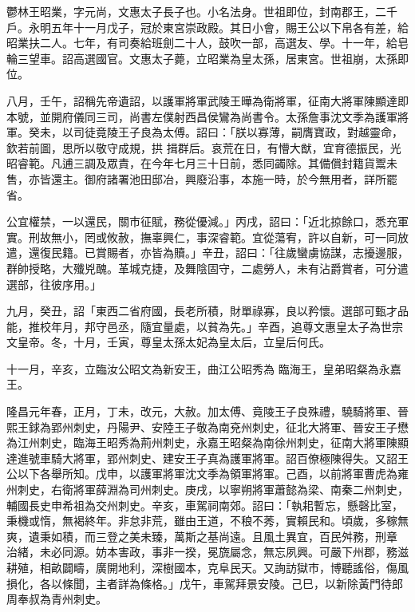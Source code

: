 
\begin{pinyinscope}

 鬱林王昭業，字元尚，文惠太子長子也。小名法身。世祖即位，封南郡王，二千戶。永明五年十一月戊子，冠於東宮崇政殿。其日小會，賜王公以下帛各有差，給昭業扶二人。七年，有司奏給班劍二十人，鼓吹一部，高選友、學。十一年，給皂輪三望車。詔高選國官。文惠太子薨，立昭業為皇太孫，居東宮。世祖崩，太孫即位。



 八月，壬午，詔稱先帝遺詔，以護軍將軍武陵王曄為衛將軍，征南大將軍陳顯達即本號，並開府儀同三司，尚書左僕射西昌侯鸞為尚書令。太孫詹事沈文季為護軍將軍。癸未，以司徒竟陵王子良為太傅。詔曰：「朕以寡薄，嗣膺寶政，對越靈命，欽若前圖，思所以敬守成規，拱
 揖群后。哀荒在日，有懵大猷，宜育德振民，光昭睿範。凡逋三調及眾責，在今年七月三十日前，悉同蠲除。其備償封籍貨鬻未售，亦皆還主。御府諸署池田邸冶，興廢沿事，本施一時，於今無用者，詳所罷省。



 公宜權禁，一以還民，關市征賦，務從優減。」丙戌，詔曰：「近北掠餘口，悉充軍實。刑故無小，罔或攸赦，撫辜興仁，事深睿範。宜從蕩宥，許以自新，可一同放遣，還復民籍。已賞賜者，亦皆為贖。」辛丑，詔曰：「往歲蠻虜協謀，志擾邊服，群帥授略，大殲兇醜。革城克捷，及舞陰固守，二處勞人，未有沾爵賞者，可分遣選部，往彼序用。」



 九月，癸丑，詔「東西二省府國，長老所積，財單祿寡，良以矜懷。選部可甄才品能，推校年月，邦守邑丞，隨宜量處，以貧為先。」辛酉，追尊文惠皇太子為世宗文皇帝。冬，十月，壬寅，尊皇太孫太妃為皇太后，立皇后何氏。



 十一月，辛亥，立臨汝公昭文為新安王，曲江公昭秀為
 臨海王，皇弟昭粲為永嘉王。



 隆昌元年春，正月，丁未，改元，大赦。加太傅、竟陵王子良殊禮，驍騎將軍、晉熙王銶為郢州刺史，丹陽尹、安陸王子敬為南兗州刺史，征北大將軍、晉安王子懋為江州刺史，臨海王昭秀為荊州刺史，永嘉王昭粲為南徐州刺史，征南大將軍陳顯達進號車騎大將軍，郢州刺史、建安王子真為護軍將軍。詔百僚極陳得失。又詔王公以下各舉所知。戊申，以護軍將軍沈文季為領軍將軍。己酉，以前將軍曹虎為雍州刺史，右衛將軍薛淵為司州刺史。庚戌，以寧朔將軍蕭懿為梁、南秦二州刺史，輔國長史申希祖為交州刺史。辛亥，車駕祠南郊。詔曰：「執耜暫忘，懸磬比室，秉機或惰，無褐終年。非怠非荒，雖由王道，不稂不莠，實賴民和。頃歲，多稼無爽，遺秉如積，而三登之美未臻，萬斯之基尚遠。且風土異宜，百民舛務，刑章
 治緒，未必同源。妨本害政，事非一揆，冕旒屬念，無忘夙興。可嚴下州郡，務滋耕殖，相畝闢疇，廣開地利，深樹國本，克阜民天。又詢訪獄市，博聽謠俗，傷風損化，各以條聞，主者詳為條格。」戊午，車駕拜景安陵。己巳，以新除黃門待郎周奉叔為青州刺史。




\end{pinyinscope}
